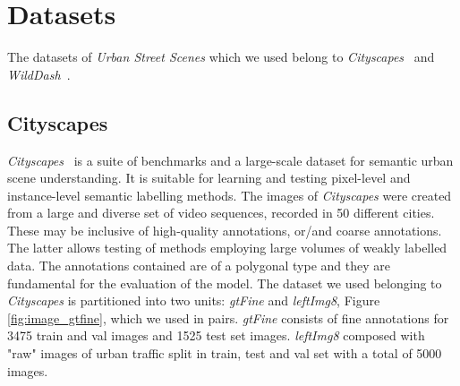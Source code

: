 \documentclass[10pt,twocolumn,letterpaper]{article}
\begin{document}
\section{Datasets}
The datasets of \textit{Urban Street Scenes} which we used belong to \textit{Cityscapes}~\cite{cityscapes} and \textit{WildDash}~\cite{wildDash}.
\subsection{Cityscapes}
\textit{Cityscapes}~\cite{cityscapes} is a suite of benchmarks and a large-scale dataset for semantic urban scene understanding. It is suitable for learning and testing pixel-level and instance-level semantic labelling methods. The images of \textit{Cityscapes} were created from a large and diverse set of video sequences, recorded in 50 different cities. These may be inclusive of high-quality annotations, or/and coarse annotations. The latter allows testing of methods employing large volumes of weakly labelled data. The annotations contained are of a polygonal type and they are fundamental for the evaluation of the model.
The dataset we used belonging to \textit{Cityscapes} is partitioned into two units: \textit{gtFine} and \textit{leftImg8}, Figure \ref{fig:image_gtfine}, which we used in pairs. \textit{gtFine} consists of fine annotations for 3475 train and val images and 1525 test set images.
\textit{leftImg8} composed with "raw" images of urban traffic split in train, test and val set with a total of 5000 images.
\end{document}
